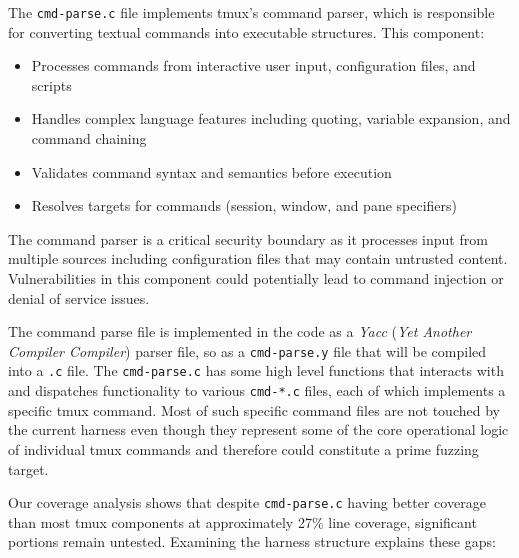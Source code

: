 \documentclass[11pt,a4paper,twocolumn]{article}
\begin{document}
The \texttt{cmd-parse.c} file implements tmux's command parser, which is responsible for converting textual commands into executable structures. This component:

\begin{itemize}
  \item Processes commands from interactive user input, configuration files, and scripts
  \item Handles complex language features including quoting, variable expansion, and command chaining
  \item Validates command syntax and semantics before execution
  \item Resolves targets for commands (session, window, and pane specifiers)
\end{itemize}

The command parser is a critical security boundary as it processes input from multiple sources including configuration files that may contain untrusted content. Vulnerabilities in this component could potentially lead to command injection or denial of service issues.

The command parse file is implemented in the code as a \textit{Yacc} (\textit{Yet Another Compiler Compiler}) parser file, so as a \texttt{cmd-parse.y} file that will be compiled into a \texttt{.c} file. The \texttt{cmd-parse.c} has some high level functions that interacts with and dispatches functionality to various \texttt{cmd-*.c} files, each of which implements a specific tmux command. Most of such specific command files are not touched by the current harness even though they represent some of the core operational logic of individual tmux commands and therefore could constitute a prime fuzzing target.

Our coverage analysis shows that despite \texttt{cmd-parse.c} having better coverage than most tmux components at approximately 27\% line coverage, significant portions remain untested. Examining the harness structure explains these gaps:
\end{document}
